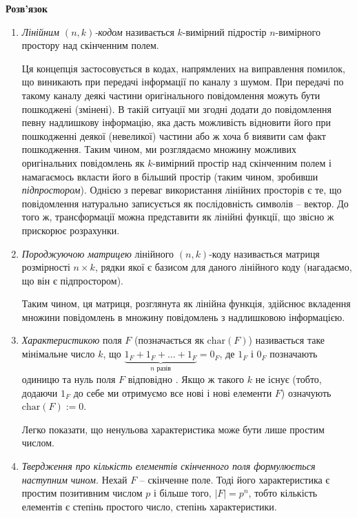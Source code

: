 \documentclass[12pt]{article} %
\newenvironment{solution}%
{\par\textbf{Розв'язок}\space }%
{\par}
\begin{document}
\begin{solution}
	\begin{enumerate}[label=\arabic*)]
		\item{\textit{Лінійним $(n,k)$-кодом} називається $k$-вимірний підростір $n$-вимірного простору над скінченним полем.
			
			Ця концепція застосовується в кодах, напрямлених на виправлення помилок, що виникають
			при передачі інформації по каналу з шумом. При передачі по такому каналу деякі частини оригінального повідомлення можуть бути пошкоджені (змінені). В такій ситуації ми згодні додати до повідомлення
			певну надлишкову інформацію, яка дасть можливість відновити його при пошкодженні деякої (невеликої) частини або ж хоча б виявити сам факт пошкодження. Таким чином, ми розглядаємо множину можливих оригінальних
			повідомлень як $k$-вимірний простір над скінченним полем і намагаємось вкласти його в більший простір (таким чином, зробивши \textit{підпростором}).
			Однією з переваг використання лінійних просторів є те, що повідомлення натурально записується як послідовність символів -- вектор. До
			того ж, трансформації можна представити як лінійні функції, що звісно ж прискорює розрахунки.}
		\item{\textit{Породжуючою матрицею} лінійного $(n,k)$-коду називається матриця розмірності $n\times k$, рядки якої є базисом для даного лінійного коду (нагадаємо, що він є підпростором). 
			
			Таким чином, ця матриця, розглянута як лінійна функція, здійснює вкладення множини повідомлень в множину повідомлень з надлишковою інформацією.}
		\item{\textit{Характеристикою} поля $F$ (позначається як $\text{char}(F)$) називається таке мінімальне число $k$, що $\underbrace{1_F+1_F+\ldots+1_F}_{n \text{ разів}}=0_F$, де $1_F$ і $0_F$ позначають одиницю та нуль поля $F$ відповідно
			. Якщо ж такого $k$ не існує (тобто,
			додаючи $1_F$ до себе ми отримуємо все нові і нові елементи $F$) означують $\text{char}(F):=0$.

			Легко показати, що ненульова характеристика може бути лише простим числом.
			}
		\item{\textit{Твердження про кількість елементів скінченного поля формулюється наступним чином.} Нехай $F$ -- скінченне поле. Тоді його характеристика
			є простим позитивним числом $p$ і більше того, $|F|=p^n$, тобто кількість елементів є степінь простого число, степінь характеристики. }
	\end{enumerate}
\end{solution}
\end{document}
